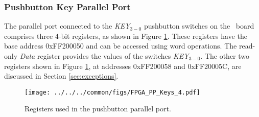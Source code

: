 \subsubsection{Pushbutton Key Parallel Port}

The parallel port connected to the {\it KEY}$_{3-0}$ 
pushbutton switches on the \DEBoard~board comprises three 4-bit
registers, as shown in Figure \ref{fig:pushbutton_port}. These registers have 
the base address {\sf 0xFF200050} and can be accessed using word operations. 
The read-only {\it Data} register provides the values of the switches {\it KEY}$_{3-0}$. 
The other two registers shown in Figure \ref{fig:pushbutton_port}, at addresses
{\sf 0xFF200058} and {\sf 0xFF20005C}, are discussed in Section \ref{sec:exceptions}.
~\\
\begin{figure}[h!]
   \begin{center}
       \texttt{[image: ../../../common/figs/FPGA\_PP\_Keys\_4.pdf]}
   \end{center}
   \caption{Registers used in the pushbutton parallel port.}
	\label{fig:pushbutton_port}
\end{figure}


